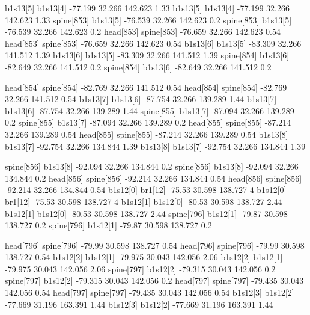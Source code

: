 b1s13[5]    b1s13[4]    -77.199    32.266    142.623    1.33
b1s13[5]    b1s13[4]    -77.199    32.266    142.623    1.33
spine[853]    b1s13[5]    -76.539    32.266    142.623    0.2
spine[853]    b1s13[5]    -76.539    32.266    142.623    0.2
head[853]    spine[853]    -76.659    32.266    142.623    0.54
head[853]    spine[853]    -76.659    32.266    142.623    0.54
b1s13[6]    b1s13[5]    -83.309    32.266    141.512    1.39
b1s13[6]    b1s13[5]    -83.309    32.266    141.512    1.39
spine[854]    b1s13[6]    -82.649    32.266    141.512    0.2
spine[854]    b1s13[6]    -82.649    32.266    141.512    0.2


head[854]    spine[854]    -82.769    32.266    141.512    0.54
head[854]    spine[854]    -82.769    32.266    141.512    0.54
b1s13[7]    b1s13[6]    -87.754    32.266    139.289    1.44
b1s13[7]    b1s13[6]    -87.754    32.266    139.289    1.44
spine[855]    b1s13[7]    -87.094    32.266    139.289    0.2
spine[855]    b1s13[7]    -87.094    32.266    139.289    0.2
head[855]    spine[855]    -87.214    32.266    139.289    0.54
head[855]    spine[855]    -87.214    32.266    139.289    0.54
b1s13[8]    b1s13[7]    -92.754    32.266    134.844    1.39
b1s13[8]    b1s13[7]    -92.754    32.266    134.844    1.39


spine[856]    b1s13[8]    -92.094    32.266    134.844    0.2
spine[856]    b1s13[8]    -92.094    32.266    134.844    0.2
head[856]    spine[856]    -92.214    32.266    134.844    0.54
head[856]    spine[856]    -92.214    32.266    134.844    0.54
b1s12[0]    br1[12]    -75.53    30.598    138.727    4
b1s12[0]    br1[12]    -75.53    30.598    138.727    4
b1s12[1]    b1s12[0]    -80.53    30.598    138.727    2.44
b1s12[1]    b1s12[0]    -80.53    30.598    138.727    2.44
spine[796]    b1s12[1]    -79.87    30.598    138.727    0.2
spine[796]    b1s12[1]    -79.87    30.598    138.727    0.2


head[796]    spine[796]    -79.99    30.598    138.727    0.54
head[796]    spine[796]    -79.99    30.598    138.727    0.54
b1s12[2]    b1s12[1]    -79.975    30.043    142.056    2.06
b1s12[2]    b1s12[1]    -79.975    30.043    142.056    2.06
spine[797]    b1s12[2]    -79.315    30.043    142.056    0.2
spine[797]    b1s12[2]    -79.315    30.043    142.056    0.2
head[797]    spine[797]    -79.435    30.043    142.056    0.54
head[797]    spine[797]    -79.435    30.043    142.056    0.54
b1s12[3]    b1s12[2]    -77.669    31.196    163.391    1.44
b1s12[3]    b1s12[2]    -77.669    31.196    163.391    1.44


